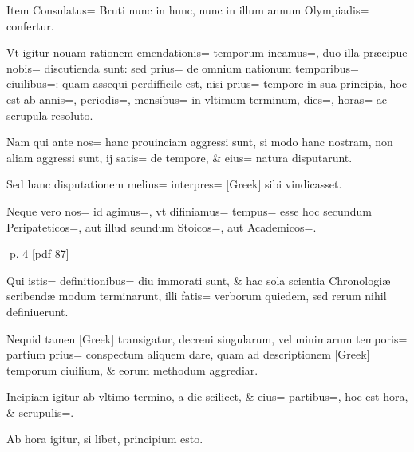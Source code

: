 \begin{parnumbers}
Item Consulatus= Bruti nunc in hunc, nunc in illum annum Olympiadis= confertur.

Vt igitur nouam rationem emendationis= temporum ineamus=, duo illa præcipue nobis= discutienda sunt: sed 
prius=  de omnium nationum temporibus= ciuilibus=: quam assequi perdifficile est, nisi prius= tempore in sua principia, hoc est ab annis=, periodis=, mensibus= in vltimum terminum, dies=, horas= ac scrupula resoluto.

Nam qui ante nos= hanc prouinciam aggressi sunt, si modo hanc nostram, non aliam aggressi sunt, ij satis= de tempore, \& eius= natura disputarunt.

Sed hanc disputationem melius= interpres= [Greek] sibi vindicasset.

Neque vero nos= id agimus=, vt difiniamus= tempus= esse hoc secundum Peripateticos=, aut illud seundum Stoicos=, aut Academicos=.

\end{parnumbers}
\clearpage
p. 4 [pdf 87]

\begin{parnumbers}

Qui istis= definitionibus= diu immorati sunt, \& hac sola scientia Chronologiæ scribendæ modum terminarunt, illi fatis=  verborum quiedem, sed rerum nihil definiuerunt.

Nequid tamen [Greek] transigatur, decreui singularum, vel minimarum temporis= partium prius= conspectum aliquem dare, quam ad descriptionem [Greek] temporum ciuilium, \& eorum methodum aggrediar.

Incipiam igitur ab vltimo termino, a die scilicet, \& eius= partibus=, hoc est hora, \& scrupulis=.

Ab hora igitur, si libet, principium esto.
\end{parnumbers}

